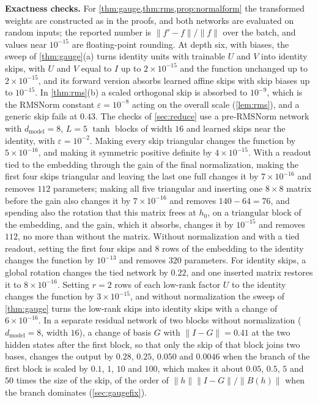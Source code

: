 \documentclass[10pt]{article}
\theoremstyle{definition}
\theoremstyle{remark}
\newcommand{\dm}{d_{\mathrm{model}}}
\newcommand{\norm}[1]{\lVert #1\rVert}
\newcommand{\para}[1]{\smallskip\noindent\textbf{#1}\hspace{0.5em}}
\begin{document}
\para{Exactness checks.} For \cref{thm:gauge,thm:rms,prop:normalform} the transformed weights are constructed as in the proofs, and both networks are evaluated on random inputs; the reported number is $\norm{f' - f}/\norm{f}$ over the batch, and values near $10^{-15}$ are floating-point rounding. At depth six, with biases, the sweep of \cref{thm:gauge}(a) turns identity units with trainable $U$ and $V$ into identity skips, with $U$ and $V$ equal to $I$ up to $2\times10^{-15}$ and the function unchanged up to $2\times10^{-15}$, and its forward version absorbs learned affine skips with skip biases up to $10^{-15}$. In \cref{thm:rms}(b) a scaled orthogonal skip is absorbed to $10^{-9}$, which is the RMSNorm constant $\varepsilon = 10^{-8}$ acting on the overall scale (\cref{lem:rms}), and a generic skip fails at $0.43$. The checks of \cref{sec:reduce} use a pre-RMSNorm network with $\dm = 8$, $L = 5$ $\tanh$ blocks of width $16$ and learned skips near the identity, with $\varepsilon = 10^{-2}$. Making every skip triangular changes the function by $5\times10^{-16}$, and making it symmetric positive definite by $4\times10^{-15}$. With a readout tied to the embedding through the gain of the final normalization, making the first four skips triangular and leaving the last one full changes it by $7\times10^{-16}$ and removes $112$ parameters; making all five triangular and inserting one $8 \times 8$ matrix before the gain also changes it by $7\times10^{-16}$ and removes $140 - 64 = 76$, and spending also the rotation that this matrix frees at $h_0$, on a triangular block of the embedding, and the gain, which it absorbs, changes it by $10^{-15}$ and removes $112$, no more than without the matrix. Without normalization and with a tied readout, setting the first four skips and $8$ rows of the embedding to the identity changes the function by $10^{-13}$ and removes $320$ parameters. For identity skips, a global rotation changes the tied network by $0.22$, and one inserted matrix restores it to $8\times10^{-16}$. Setting $r = 2$ rows of each low-rank factor $U$ to the identity changes the function by $3\times10^{-15}$, and without normalization the sweep of \cref{thm:gauge} turns the low-rank skips into identity skips with a change of $6\times10^{-16}$. In a separate residual network of two blocks without normalization ($\dm = 8$, width $16$), a change of basis $G$ with $\norm{I - G} = 0.41$ at the two hidden states after the first block, so that only the skip of that block joins two bases, changes the output by $0.28$, $0.25$, $0.050$ and $0.0046$ when the branch of the first block is scaled by $0.1$, $1$, $10$ and $100$, which makes it about $0.05$, $0.5$, $5$ and $50$ times the size of the skip, of the order of $\norm{h}\norm{I - G}/\norm{B(h)}$ when the branch dominates (\cref{sec:gaugefix}).
\end{document}
